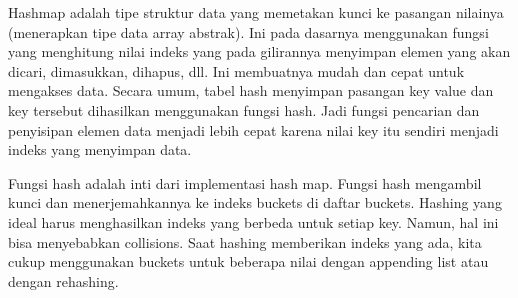 Hashmap adalah tipe struktur data yang memetakan kunci ke pasangan nilainya (menerapkan tipe data array abstrak). Ini pada dasarnya menggunakan fungsi yang menghitung nilai indeks yang pada gilirannya menyimpan elemen yang akan dicari, dimasukkan, dihapus, dll. Ini membuatnya mudah dan cepat untuk mengakses data. Secara umum, tabel hash menyimpan pasangan key value dan key tersebut dihasilkan menggunakan fungsi hash. Jadi fungsi pencarian dan penyisipan elemen data menjadi lebih cepat karena nilai key itu sendiri menjadi indeks yang menyimpan data.

Fungsi hash adalah inti dari implementasi hash map. Fungsi hash mengambil kunci dan menerjemahkannya ke indeks buckets di daftar buckets. Hashing yang ideal harus menghasilkan indeks yang berbeda untuk setiap key. Namun, hal ini bisa menyebabkan collisions. Saat hashing memberikan indeks yang ada, kita cukup menggunakan buckets untuk beberapa nilai dengan appending list atau dengan rehashing.

